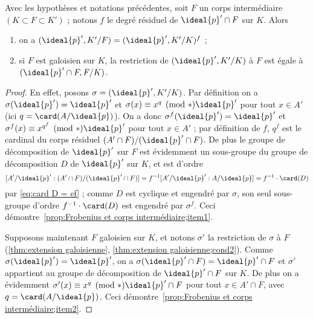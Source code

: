 \documentclass[11pt, useosf,
  title in boldface,
  theorem in new line,
  theorem numbering = section,
  number theorems separately,
]{simplivre}
\begin{document}
\enlargethispage*{\baselineskip}
    \begin{proposition}\label{prop:Frobenius et corps intermédiaire}
        Avec les hypothèses et notations précédentes, soit \( F \) un corps intermédiaire \( (K \subset F \subset K') \) ; notons \( f \) le degré résiduel de \( \ideal{p}' \cap F \) sur \( K \). Alors
        \begin{enumerate}
            \item \label{prop:Frobenius et corps intermédiaire;item1} on a \( (\ideal{p}',K'/F) = (\ideal{p}',K'/K)^f \) ;
            \item \label{prop:Frobenius et corps intermédiaire;item2} si \( F \) est galoisien sur \( K \), la restriction de \( (\ideal{p}',K'/K) \) à \( F \) est égale à \( (\ideal{p}' \cap F, F/K) \).
        \end{enumerate}
    \end{proposition}
    \begin{proof}
        En effet, posons \( \sigma = (\ideal{p}',K'/K) \). Par définition on a \( \sigma(\ideal{p}') = \ideal{p}' \) et \( \sigma(x) \equiv x^q \pmod*{\ideal{p}'} \) pour tout \( x \in A' \) (ici \( q = \card(A/\ideal{p}) \)). On a donc \( \sigma^f(\ideal{p}') = \ideal{p}' \) et \( \sigma^f(x) \equiv x^{q^f} \pmod*{\ideal{p}'} \) pour tout \( x \in A' \) ; par définition de \( f \), \( q^f \) est le cardinal du corps résiduel \( (A' \cap F)/(\ideal{p}' \cap F) \). De plus le groupe de décomposition de \( \ideal{p}' \) sur \( F \) est évidemment un sous-groupe du groupe de décomposition \( D \) de \( \ideal{p}' \) sur \( K \), et est d'ordre
        \[
            [ A'/\ideal{p}' : (A' \cap F)/(\ideal{p}' \cap F) ] = f^{-1}[ A'/\ideal{p}' : A/\ideal{p} ] = f^{-1} \cdot \card(D)
        \]
        par \eqref{eq:card D = ef} ; comme \( D \) est cyclique et engendré par \( \sigma \), son seul sous-groupe d'ordre \( f^{-1} \cdot \card(D) \) est engendré par \( \sigma^f \). Ceci démontre~\ref{prop:Frobenius et corps intermédiaire;item1}.

        Supposons maintenant \( F \) galoisien sur \( K \), et notons \( \sigma' \) la restriction de \( \sigma \) à \( F \) (\cref{thm:extension galoisienne}, \ref{thm:extension galoisienne;cond2}). Comme \( \sigma(\ideal{p}') = \ideal{p}' \), on a \( \sigma(\ideal{p}' \cap F) = \ideal{p}' \cap F \) et \( \sigma' \) appartient au groupe de décomposition de \( \ideal{p}' \cap F \) sur \( K \). De plus on a évidemment \( \sigma'(x) \equiv x^q \pmod*{\ideal{p}' \cap F} \) pour tout \( x \in A' \cap F \), avec \( q = \card(A/\ideal{p}) \). Ceci démontre~\ref{prop:Frobenius et corps intermédiaire;item2}.
    \end{proof}
\end{document}
